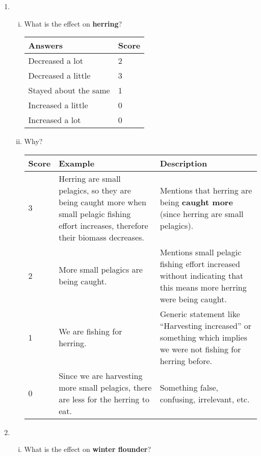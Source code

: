 {\setlength{\itemsep}{2em}
\begin{enumerate}


\item 
\begin{enumerate}[i.]
\item What is the effect on \textbf{herring}? 

{\small
{}
\begin{tabular}{| l | l |} \hline
\rowcolor{cyan!35} \textbf{Answers} & \textbf{Score} \\ \hline
Decreased a lot & 2 \\ 
Decreased a little & 3 \\ 
Stayed about the same & 1 \\ 
Increased a little & 0 \\
Increased a lot & 0 \\
\hline
\end{tabular}
}

\item Why?

{\small
{}
\begin{tabular}{| l | p{5.25cm} | p{5.7cm} |} \hline
\rowcolor{cyan!35} \textbf{Score} & \textbf{Example} & \textbf{Description} \\ \hline
3 & Herring are small pelagics, so they are being caught more when small pelagic fishing effort increases, therefore their biomass decreases. & Mentions that herring are being \textbf{caught more} (since herring are small pelagics). \\ 
2 & More small pelagics are being caught. & Mentions small pelagic fishing effort increased without indicating that this means more herring were being caught. \\ 
1 & We are fishing for herring. & Generic statement like ``Harvesting increased'' or something which implies we were not fishing for herring before. \\ 
0 & Since we are harvesting more small pelagics, there are less for the herring to eat. & Something false, confusing, irrelevant, etc. \\
\hline
\end{tabular}
}

\end{enumerate}

\clearpage

\item 
\begin{enumerate}[i.]
\item What is the effect on \textbf{winter flounder}?


\end{enumerate}
\end{enumerate}}

